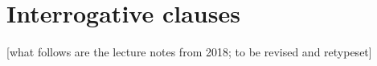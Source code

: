 \chapter{Interrogative clauses}\label{cha:interrogatives}

[what follows are the lecture notes from 2018; to be revised and retypeset]




